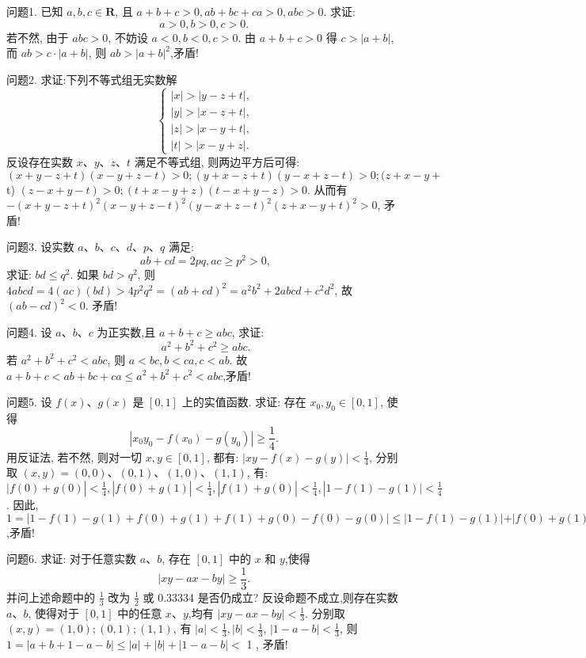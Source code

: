 
问题1. 已知 $a, b, c \in \mathbf{R}$, 且 $a+b+c>0, a b+b c+c a>0, a b c>0$. 求证:
$$
a>0, b>0, c>0 \text {. }
$$
若不然, 由于 $a b c>0$, 不妨设 $a<0, b<0, c>0$. 由 $a+b+c>0$ 得 $c>|a+b|$, 而 $a b>c \cdot|a+b|$, 则 $a b>|a+b|^2$,矛盾!



问题2. 求证:下列不等式组无实数解
$$
\left\{\begin{array}{l}
|x|>|y-z+t|, \\
|y|>|x-z+t|, \\
|z|>|x-y+t|, \\
|t|>|x-y+z| .
\end{array}\right.
$$
反设存在实数 $x 、 y 、 z 、 t$ 满足不等式组, 则两边平方后可得: $(x+y- z+t)(x-y+z-t)>0 ;(y+x-z+t)(y-x+z-t)>0 ;(z+x-y+$ t) $(z-x+y-t)>0 ;(t+x-y+z)(t-x+y-z)>0$. 从而有 $-(x+y- z+t)^2(x-y+z-t)^2(y-x+z-t)^2(z+x-y+t)^2>0$, 矛盾!



问题3. 设实数 $a 、 b 、 c 、 d 、 p 、 q$ 满足:
$$
a b+c d=2 p q, a c \geqslant p^2>0,
$$
求证: $b d \leqslant q^2$.
如果 $b d>q^2$, 则 $4 a b c d=4(a c)(b d)>4 p^2 q^2=(a b+c d)^2=a^2 b^2+ 2 a b c d+c^2 d^2$, 故 $(a b-c d)^2<0$. 矛盾!



问题4. 设 $a 、 b 、 c$ 为正实数,且 $a+b+c \geqslant a b c$, 求证:
$$
a^2+b^2+c^2 \geqslant a b c .
$$
若 $a^2+b^2+c^2<a b c$, 则 $a<b c, b<c a, c<a b$.
故 $a+b+c<a b+b c+c a \leqslant a^2+b^2+c^2<a b c$,矛盾!



问题5. 设 $f(x) 、 g(x)$ 是 $[0,1]$ 上的实值函数.
求证: 存在 $x_0, y_0 \in[0,1]$, 使得
$$
\left|x_0 y_0-f\left(x_0\right)-g\left(y_0\right)\right| \geqslant \frac{1}{4} \text {. }
$$
用反证法, 若不然, 则对一切 $x, y \in[0,1]$, 都有: $\mid x y-f(x)- g(y) \mid<\frac{1}{4}$, 分别取 $(x, y)=(0,0) 、(0,1) 、(1,0) 、(1,1)$, 有: $\mid f(0)+ g(0)\left|<\frac{1}{4},\right| f(0)+g(1)\left|<\frac{1}{4},\right| f(1)+g(0)\left|<\frac{1}{4},\right| 1-f(1)- g(1) \mid<\frac{1}{4}$.
因此, $1=\mid 1-f(1)-g(1)+f(0)+g(1)+f(1)+g(0)-f(0)- g(0)|\leqslant| 1-f(1)-g(1)|+| f(0)+g(1)|+| f(1)+g(0)|+| f(0)+ g(0) \mid<1$,矛盾!



问题6. 求证: 对于任意实数 $a 、 b$, 存在 $[0,1]$ 中的 $x$ 和 $y$,使得
$$
|x y-a x-b y| \geqslant \frac{1}{3} \text {. }
$$
并问上述命题中的 $\frac{1}{3}$ 改为 $\frac{1}{2}$ 或 0.33334 是否仍成立?
反设命题不成立,则存在实数 $a 、 b$, 使得对于 $[0,1]$ 中的任意 $x 、 y$,均有 $|x y-a x-b y|<\frac{1}{3}$.
分别取 $(x, y)=(1,0) ;(0,1) ;(1,1)$, 有 $|a|<\frac{1}{3},|b|<\frac{1}{3}$, $|1-a-b|<\frac{1}{3}$, 则 $1=|a+b+1-a-b| \leqslant|a|+|b|+|1-a-b|<$ 1 , 矛盾!



